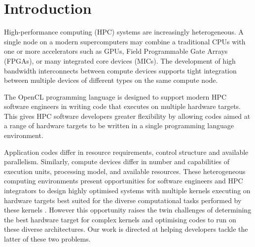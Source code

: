 \documentclass[review=false, sigchi]{acmart}
\begin{document}
	\maketitle	
	
	\section{Introduction}
	
	High-performance computing (HPC) systems are increasingly heterogeneous.
	A single node on a modern supercomputers may combine a traditional CPUs with one or more accelerators such as GPUs, Field Programmable Gate Arrays (FPGAs), or many integrated core devices (MICs).
	The development of high bandwidth interconnects between compute devices supports tight integration between multiple devices of different types on the same compute node.
	
	The OpenCL programming language is designed to support modern HPC software engineers in writing code that executes on multiple hardware targets. 
	This gives HPC software developers greater flexibility by allowing codes aimed at a range of hardware targets to be written in a single programming language environment.
	
	Application codes differ in resource requirements, control structure and available parallelism. Similarly, compute devices differ in number and capabilities of execution units, processing model, and available resources. These heterogeneous computing environments present opportunities for software engineers and HPC integrators to design highly optimised systems with multiple kernels executing on hardware targets best suited for the diverse computational tasks performed by these kernels \cite{spafford2010maestro}.
	However this opportunity raises the twin challenges of determining the best hardware target for complex kernels and optimising codes to run on these diverse architectures.
	Our work is directed at helping developers tackle the latter of these two problems.
	
\end{document}
